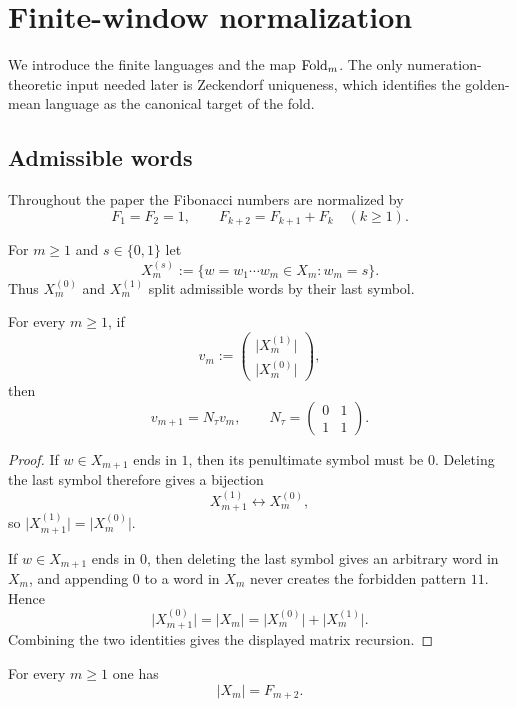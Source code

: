 \section{Finite-window normalization}

We introduce the finite languages and the map $\operatorname{Fold}_m$.  The only
numeration-theoretic input needed later is Zeckendorf uniqueness, which
identifies the golden-mean language as the canonical target of the fold.

\subsection{Admissible words}

Throughout the paper the Fibonacci numbers are normalized by
\[
F_1=F_2=1,
\qquad
F_{k+2}=F_{k+1}+F_k
\quad (k\ge 1).
\]

For $m\ge 1$ and $s\in\{0,1\}$ let
\[
X_m^{(s)}:=\{w=w_1\cdots w_m\in X_m:w_m=s\}.
\]
Thus $X_m^{(0)}$ and $X_m^{(1)}$ split admissible words by their last symbol.

\begin{proposition}
\label{prop:stable-syntax-terminal-recursion}
For every $m\ge 1$, if
\[
v_m:=
\begin{pmatrix}
\lvert X_m^{(1)}\rvert\\[2pt]
\lvert X_m^{(0)}\rvert
\end{pmatrix},
\]
then
\[
v_{m+1}=N_\tau v_m,
\qquad
N_\tau=
\begin{pmatrix}
0&1\\[2pt]
1&1
\end{pmatrix}.
\]
\end{proposition}

\begin{proof}
If $w\in X_{m+1}$ ends in $1$, then its penultimate symbol must be $0$.
Deleting the last symbol therefore gives a bijection
\[
X_{m+1}^{(1)}\longleftrightarrow X_m^{(0)},
\]
so $\lvert X_{m+1}^{(1)}\rvert=\lvert X_m^{(0)}\rvert$.

If $w\in X_{m+1}$ ends in $0$, then deleting the last symbol gives an
arbitrary word in $X_m$, and appending $0$ to a word in $X_m$ never creates
the forbidden pattern $11$.  Hence
\[
\lvert X_{m+1}^{(0)}\rvert
=
\lvert X_m\rvert
=
\lvert X_m^{(0)}\rvert+\lvert X_m^{(1)}\rvert.
\]
Combining the two identities gives the displayed matrix recursion.
\end{proof}

\begin{corollary}
\label{cor:stable-syntax-counting}
For every $m\ge 1$ one has
\[
\lvert X_m\rvert=F_{m+2}.
\]
\end{corollary}

